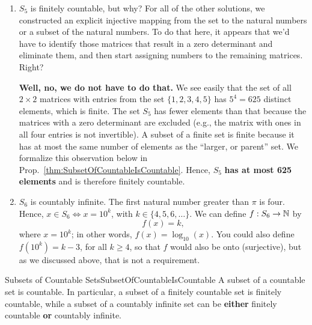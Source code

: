 \begin{enumerate}
\textbf{Note:} Suppose the matrices in $S_4$ had $n$-entries and their values were drawn from the set $\{0, 1, \ldots, M-1 \}$, where $n$ and $M$ are counting numbers, $M\ge 2$. Then there are $M^n$ distinct matrices, and you can define $f(A) = 1 + \sum_{i=1}^n a_i M^{i-1}$, which associates a unique counting number to each element of the set, and injectivity (one-to-one-ness) is easy to prove if you think of the number as being in base $M$. 

\item $S_5$ is finitely countable, but why? For all of the other solutions, we constructed an explicit injective mapping from the set to the natural numbers or a subset of the natural numbers. To do that here, it appears that we'd have to identify those matrices that result in a zero determinant and eliminate them, and then start assigning numbers to the remaining matrices. Right? 

\textbf{Well, no, we do not have to do that.} We see easily that the set of all $2 \times 2$ matrices with entries from the set $\{1, 2, 3, 4, 5\}$ has $5^4 = 625$ distinct elements, which is finite. The set $S_5$ has fewer elements than that because the matrices with a zero determinant are excluded (e.g., the matrix with ones in all four entries is not invertible). A subset of a finite set is finite because it has at most the same number of elements as the ``larger, or parent'' set. We formalize this observation below in Prop.~\ref{thm:SubsetOfCountableIsCountable}. Hence, $S_5$ \textbf{has at most 625 elements} and is therefore finitely countable.

\item $S_6$ is countably infinite. The first natural number greater than $\pi$ is four. Hence, $x \in S_6 \iff x = 10^k$, with $k \in \{4, 5, 6, \ldots \}$. We can define $f:S_6 \to \mathbb N$ by
$$f(x)=k,$$
where $x=10^k$; in other words, $f(x) = \log_{10}(x)$. You could also define $f(10^k)=k-3$, for all $k \ge 4$, so that $f$ would also be onto (surjective), but as we discussed above, that is not a requirement. 

\end{enumerate}

\Qed

\begin{propColor}{Subsets of Countable Sets}{SubsetOfCountableIsCountable}
A subset of a countable set is countable. In particular, a subset of a finitely countable set is finitely countable, while a subset of a countably infinite set can be \textbf{either} finitely countable \textbf{or} countably infinite.
    
\end{propColor}

